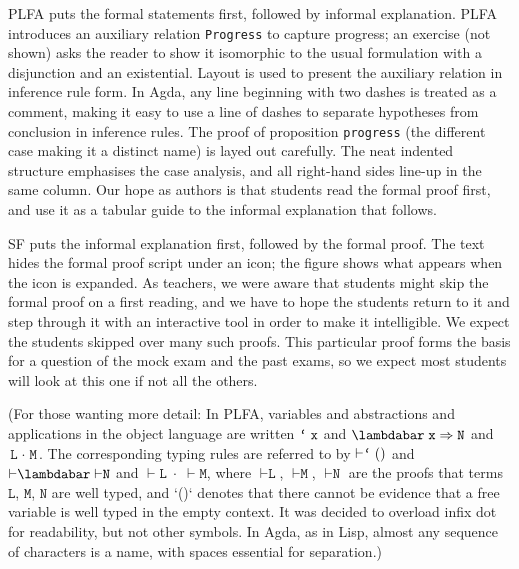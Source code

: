 \documentclass[preprint,authoryear]{elsarticle}
\begin{document}
PLFA puts the formal statements first, followed by informal explanation.
PLFA introduces an auxiliary relation \texttt{Progress} to capture
progress; an exercise (not shown) asks the reader to show it isomorphic
to the usual formulation with a disjunction and an existential.
Layout is used to present the auxiliary relation in inference rule form.
In Agda, any line beginning with two dashes is treated as a comment, making
it easy to use a line of dashes to separate hypotheses from conclusion
in inference rules.  The proof of proposition \texttt{progress} (the different
case making it a distinct name) is layed out carefully. The neat
indented structure emphasises the case analysis, and all right-hand
sides line-up in the same column.  Our hope as authors is that students
read the formal proof first, and use it as a tabular guide
to the informal explanation that follows.

SF puts the informal explanation first, followed by the formal proof. The text
hides the formal proof script under an icon; the figure shows what appears when
the icon is expanded. As teachers, we were aware that students might skip the
formal proof on a first reading, and we have to hope the students
return to it and step through it with an interactive tool in order to make it
intelligible.  We expect the students skipped over many such proofs.  This
particular proof forms the basis for a question of the mock exam and the past
exams, so we expect most students will look at this one if not all the
others.

\newcommand{\ex}{\texttt{x}}
\newcommand{\why}{\texttt{y}}
\newcommand{\EL}{\texttt{L}}
\newcommand{\EM}{\texttt{M}}
\newcommand{\EN}{\texttt{N}}
\newcommand{\tee}{\texttt{t}}
\newcommand{\tick}{\texttt{\lq}}
\newcommand{\GG}{\Gamma}
\newcommand{\AY}{\texttt{A}}
\newcommand{\BE}{\texttt{B}}

(For those wanting more detail: In PLFA, variables and abstractions and
applications in the object language are written $\tick\;\ex$ and
$\lambdabar\;\ex\;{\Rightarrow}\;\EN$ and $\EL\;{\cdot}\;\EM$.  The
corresponding typing rules are referred to by ${\vdash}\tick\;()$
and ${\vdash}\lambdabar\;{\vdash}\EN$ and ${\vdash}\EL\;{\cdot}\;{\vdash}\EM$, where
${\vdash}\EL$, ${\vdash}\EM$, ${\vdash}\EN$ are the proofs that terms
$\EL$, $\EM$, $\EN$ are well typed, and `()` denotes that there cannot
be evidence that a free variable is well typed in the empty context.
It was decided to overload infix dot for readability, but not other
symbols. In Agda, as in Lisp, almost any sequence of characters is a
name, with spaces essential for separation.)
\end{document}
